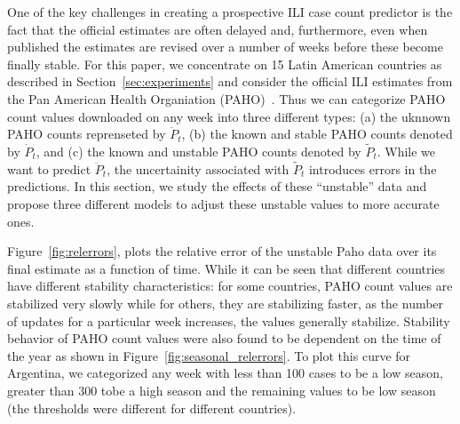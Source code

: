 One of the key challenges in creating a prospective ILI case count
predictor is the fact that the official estimates are often 
delayed and, furthermore, even when published the estimates are revised
over a number of weeks before these become finally stable.
For this paper, we concentrate on 15 Latin American countries 
as described in Section~\ref{sec:experiments} and consider the official 
ILI estimates from the Pan American Health Organiation (PAHO)~\cite{PAHO:2013}.
Thus we can categorize PAHO count values downloaded on any week
into three different types: (a) the uknnown
PAHO counts reprenseted  by $\ddot{P}_t$, (b) the known and stable PAHO counts
denoted by $\dot{P}_t$, and (c) the known and unstable PAHO counts denoted by
$\tilde{P}_t$. While we want to predict $\ddot{P}_t$, the uncertainity associated
with $\tilde{P}_t$ introduces errors in the predictions. In this section, 
we study the effects of these ``unstable'' data and propose 
three different models to adjust these unstable
values to more accurate ones.


Figure~\ref{fig:relerrors}, plots the relative error of the unstable Paho data over
its final estimate as a function of time. While it can be seen that different countries 
have different stability characteristics: 
for some countries, PAHO count values are
stabilized very slowly while for others, they are stabilizing faster, as the number of 
updates for a particular week increases, the values generally stabilize.
Stability behavior of PAHO count values were also found to be dependent on the 
time of the year as shown in Figure~\ref{fig:seasonal_relerrors}.
To plot this curve for Argentina, we categorized any week with less than 100 cases to be a low season,
greater than 300 tobe a high season and the remaining values to be low season (the thresholds
were different for different countries).

